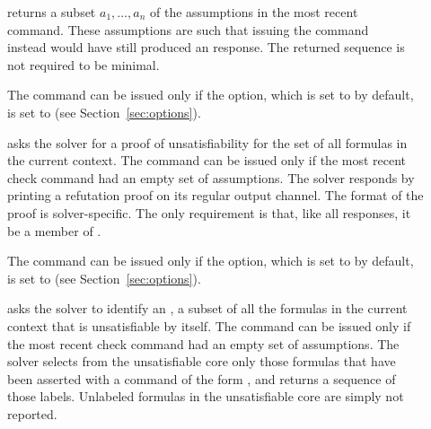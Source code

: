 \begin{description}
%
\item[]
returns a subset $a_1, \ldots,a_n$ of the assumptions in the most recent \\
 command.
These assumptions are such that issuing the command \\
instead would have still produced an  response.
The returned sequence is not required to be minimal.

The command can be issued only if the  option,
which is set to  by default, is set to  
(see Section~\ref{sec:options}).
\smallskip

%
\item[]
asks the solver for a proof of unsatisfiability for the set of all formulas
in the current context.  
The command can be issued only if the most recent check command had an empty set 
of assumptions.
The solver responds by printing a refutation proof 
on its regular output channel.
The format of the proof is solver-specific.
The only requirement is that, like all responses, it be a member 
of .

The command can be issued only if the  option,
which is set to  by default, is set to  
(see Section~\ref{sec:options}).
\smallskip

%
\item[]
asks the solver to identify an , a subset of all 
the formulas in the current context that is unsatisfiable by itself.
The command can be issued only if the most recent check command had an empty set 
of assumptions.
The solver selects from the unsatisfiable core only those formulas
that have been asserted with a command of the form
, and returns a sequence
 of those labels.
Unlabeled formulas in the unsatisfiable core are simply not reported.


\end{description}
